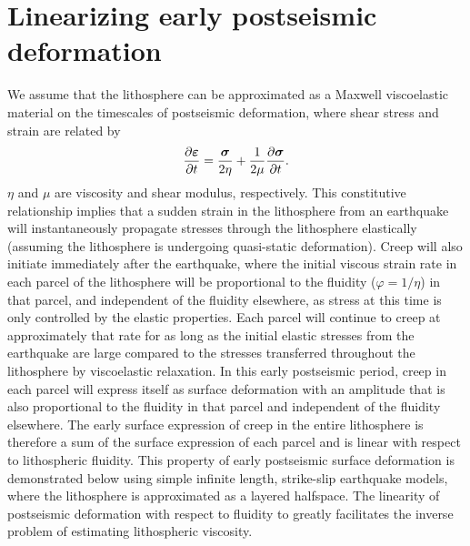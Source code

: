 \documentclass[extra]{gji}
\begin{document}
\section{Linearizing early postseismic deformation} 
We assume that the lithosphere can be approximated as a Maxwell
viscoelastic material on the timescales of postseismic deformation,
where shear stress and strain are related by
\begin{equation}
  \frac{\partial\mitbf{\varepsilon}}{\partial t}=\frac{\mitbf{\sigma}}{2\eta} + 
                              \frac{1}{2\mu}\frac{\partial\mitbf{\sigma}}{\partial t}.
\end{equation}
$\eta$ and $\mu$ are viscosity and shear modulus, respectively.  This
constitutive relationship implies that a sudden strain in the
lithosphere from an earthquake will instantaneously propagate stresses
through the lithosphere elastically (assuming the lithosphere is
undergoing quasi-static deformation).  Creep will also initiate
immediately after the earthquake, where the initial viscous strain
rate in each parcel of the lithosphere will be proportional to the
fluidity ($\varphi=1/\eta$) in that parcel, and independent of the
fluidity elsewhere, as stress at this time is only controlled by the
elastic properties.  Each parcel will continue to creep at
approximately that rate for as long as the initial elastic stresses
from the earthquake are large compared to the stresses transferred
throughout the lithosphere by viscoelastic relaxation.  In this early
postseismic period, creep in each parcel will express itself as
surface deformation with an amplitude that is also proportional to the
fluidity in that parcel and independent of the fluidity elsewhere.
The early surface expression of creep in the entire lithosphere is
therefore a sum of the surface expression of each parcel and is linear
with respect to lithospheric fluidity.  This property of early
postseismic surface deformation is demonstrated below using simple
infinite length, strike-slip earthquake models, where the lithosphere
is approximated as a layered halfspace.  The linearity of
postseismic deformation with respect to fluidity to greatly
facilitates the inverse problem of estimating lithospheric viscosity.
\end{document}
